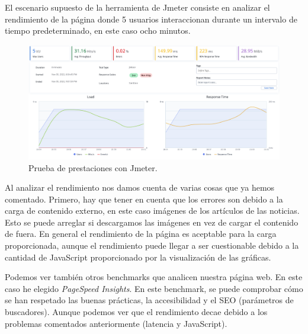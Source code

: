 \vspace{0.3cm}

El escenario supuesto de la herramienta de Jmeter consiste en analizar el rendimiento de la página donde 5 usuarios interaccionan durante un intervalo de tiempo predeterminado, en este caso ocho minutos.

\begin{figure}[H]
    \centering
    \myfloatalign
    \includegraphics[width=1\textwidth]{gfx/prueba1.png}
    \caption[Prueba de prestaciones con Jmeter]{Prueba de prestaciones con Jmeter.}\label{gfx:prueba1}
\end{figure}

Al analizar el rendimiento nos damos cuenta de varias cosas que ya hemos comentado. Primero, hay que tener en cuenta que los errores son debido a la carga de contenido externo, en este caso imágenes de los artículos de las noticias. Esto se puede arreglar si descargamos las imágenes en vez de cargar el contenido de fuera. En general el rendimiento de la página es aceptable para la carga proporcionada, aunque el rendimiento puede llegar a ser cuestionable debido a la cantidad de JavaScript proporcionado por la visualización de las gráficas.

\vspace{0.3cm}

Podemos ver también otros benchmarks que analicen nuestra página web. En este caso he elegido \textit{PageSpeed Insights}. En este benchmark, se puede comprobar cómo se han respetado las buenas prácticas, la accesibilidad y el SEO (parámetros de buscadores). Aunque podemos ver que el rendimiento decae debido a los problemas comentados anteriormente (latencia y JavaScript).

